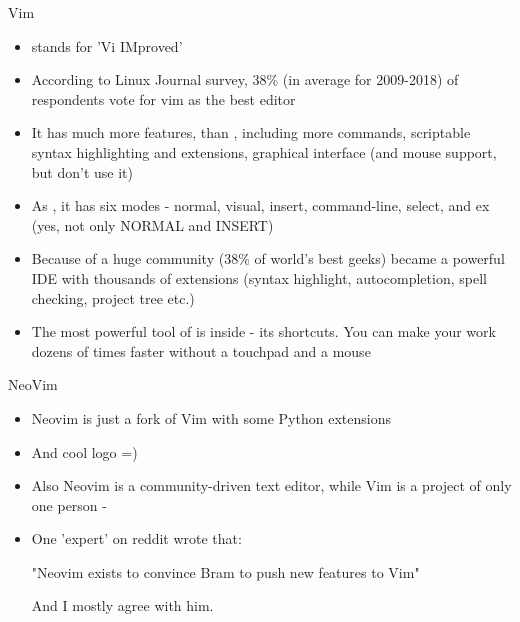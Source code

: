 \documentclass[usenames,dvipsnames,10pt,aspectratio=169]{beamer}
\begin{document}
\begin{frame}{Vim}
    \begin{itemize}
        \item {} stands for 'Vi IMproved'
        \item According to Linux Journal survey, 38\% (in average for 2009-2018) of respondents vote for vim as the best editor
        \item It has much more features, than , including more commands, scriptable syntax highlighting and extensions, graphical interface (and mouse support, but don't use it)
        \item As , it has six modes - normal, visual, insert, command-line, select, and ex (yes, not only NORMAL and INSERT)
        \item Because of a huge community (38\% of world's best geeks)  became a powerful IDE with thousands of extensions (syntax highlight, autocompletion, spell checking, project tree etc.)
        \item The most powerful tool of  is inside - its shortcuts. You can make your work dozens of times faster without a touchpad and a mouse
    \end{itemize}
\end{frame}

\begin{frame}{NeoVim}
    \begin{itemize}
        \item Neovim is just a fork of Vim with some Python extensions 
        \item And cool logo =)
        \item Also Neovim is a community-driven text editor, while Vim is a project of only one person - 
        \item One 'expert' on reddit wrote that:
        
                \hspace*{1cm} "Neovim exists to convince Bram to push new features to Vim"
            
            And I mostly agree with him.
    \end{itemize}    
\end{frame}
\end{document}
